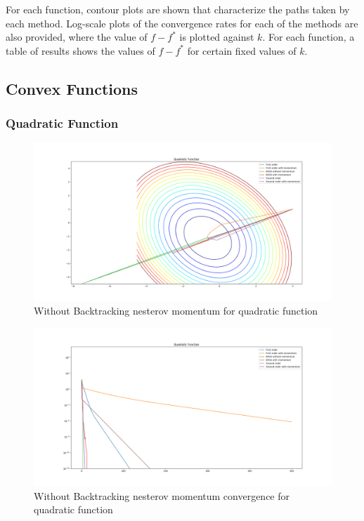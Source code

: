 \documentclass{article}
\begin{document}
For each function, contour plots are shown that characterize the paths taken by each method. Log-scale plots of the convergence rates for each of the methods are also provided, where the value of $f-f^*$ is plotted against $k$. For each function, a table of results shows the values of $f-f^*$ for certain fixed values of $k$.

\subsection{Convex Functions}

\subsubsection{Quadratic Function}

\begin{figure}[H]
	\includegraphics[width=\linewidth]{../Images/quadraticnesterov.png}
	\caption{Without Backtracking nesterov momentum for quadratic function}
	\label{fig:Without Backtracking nesterov momentum for quadratic function}
\end{figure}

\begin{figure}[H]
	\includegraphics[width=\linewidth]{../Images/quadraticnesterov1.png}
	\caption{Without Backtracking nesterov momentum convergence for quadratic function}
	\label{fig:Without Backtracking nesterov momentum convergence for quadratic function}
\end{figure}
\end{document}
